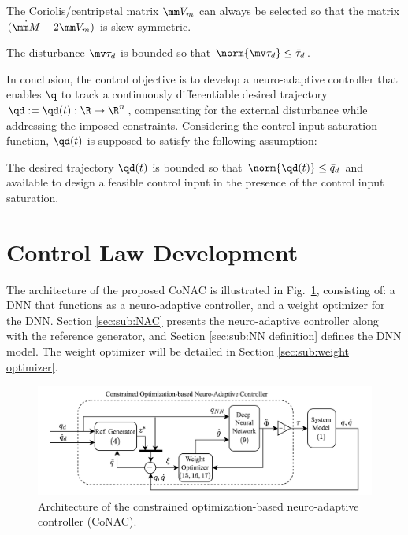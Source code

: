 \documentclass[lettersize,journal]{IEEEtran}
\begin{document}
\begin{prop} 
    The Coriolis/centripetal matrix $\mm V_m$ can always be selected so that the matrix $(\dot{\mm M}-2\mm V_m)$ is skew-symmetric.
    \label{prop:skew}
\end{prop}

\begin{prop}
    The disturbance $\mv\tau_d$ is bounded so that $\norm{\mv\tau_d}\le \bar\tau_d$.
    \label{prop:dis_bound}
\end{prop}

In conclusion, the control objective is to develop a neuro-adaptive controller that enables $\q$ to track a continuously differentiable desired trajectory $\qd:=\qd(t): \R \to \R^n$, compensating for the external disturbance while addressing the imposed constraints.
Considering the control input saturation function, $\qd(t)$ is supposed to satisfy the following assumption:
\begin{assum}
    The desired trajectory $\qd(t)$ is bounded so that $\norm{\qd(t)}\le \bar{q}_d$ and available to design a feasible control input in the presence of the control input saturation.
    \label{assum:feasible}
\end{assum}

\section{Control Law Development}\label{sec:ctrl design}

The architecture of the proposed CoNAC is illustrated in Fig.~\ref{fig:ctrl:diagram}, consisting of: a DNN that functions as a neuro-adaptive controller, and a weight optimizer for the DNN. 
Section \ref{sec:sub:NAC} presents the neuro-adaptive controller along with the reference generator, and Section \ref{sec:sub:NN definition} defines the DNN model. The weight optimizer will be detailed in Section \ref{sec:sub:weight optimizer}.

\begin{figure}[!t]
    \centering
    \includegraphics[width=0.7\linewidth]{fig/Controller.drawio.png}
    \caption{Architecture of the constrained optimization-based neuro-adaptive controller (CoNAC).}
    \label{fig:ctrl:diagram}
\end{figure}
\end{document}
